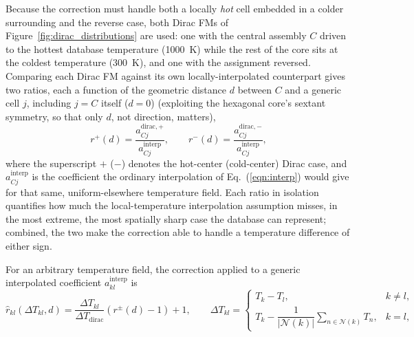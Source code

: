 \documentclass{style/nseJournal}
\begin{document}
Because the correction must handle both a locally \emph{hot} cell embedded in a colder surrounding and the reverse case, both Dirac FMs of Figure~\ref{fig:dirac_distributions} are used: one with the central assembly $C$ driven to the hottest database temperature (1000~K) while the rest of the core sits at the coldest temperature (300~K), and one with the assignment reversed. Comparing each Dirac FM against its own locally-interpolated counterpart gives two ratios, each a function of the geometric distance $d$ between $C$ and a generic cell $j$, including $j=C$ itself ($d=0$) (exploiting the hexagonal core's sextant symmetry, so that only $d$, not direction, matters),
\begin{equation}
  r^{+}(d) = \frac{a^{\text{dirac},+}_{Cj}}{a^{\text{interp}}_{Cj}},
  \qquad
  r^{-}(d) = \frac{a^{\text{dirac},-}_{Cj}}{a^{\text{interp}}_{Cj}},
  \label{eqn:ratio_def}
\end{equation}
where the superscript $+$ ($-$) denotes the hot-center (cold-center) Dirac case, and $a^{\text{interp}}_{Cj}$ is the coefficient the ordinary interpolation of Eq.~(\ref{eqn:interp}) would give for that same, uniform-elsewhere temperature field. Each ratio in isolation quantifies how much the local-temperature interpolation assumption misses, in the most extreme, the most spatially sharp case the database can represent; combined, the two make the correction able to handle a temperature difference of either sign.

For an arbitrary temperature field, the correction applied to a generic interpolated coefficient $a^{\text{interp}}_{kl}$ is
\begin{equation}
  \hat r_{kl}(\Delta T_{kl}, d) = \frac{\Delta T_{kl}}{\Delta T_{\text{dirac}}} \left( r^{\pm}(d) - 1 \right) + 1,
  \qquad
  \Delta T_{kl} =
  \begin{cases}
    T_k - T_l, & k \neq l, \\[4pt]
    T_k - \dfrac{1}{|\mathcal{N}(k)|}\displaystyle\sum_{n\in\mathcal{N}(k)} T_n, & k = l,
  \end{cases}
  \label{eqn:ctcr}
\end{equation}
\end{document}
